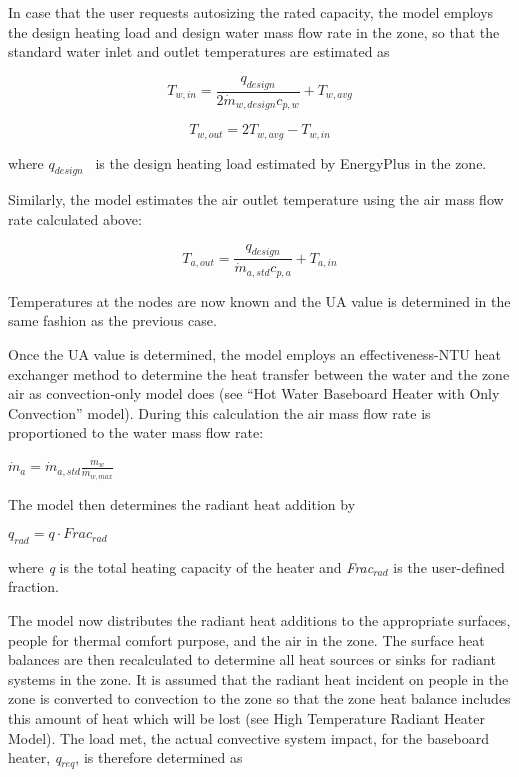 In case that the user requests autosizing the rated capacity, the model employs the design heating load and design water mass flow rate in the zone, so that the standard water inlet and outlet temperatures are estimated as

\begin{equation}
{T_{w,in}} = \frac{{{q_{design}}}}{{2\dot m{}_{w,design}{c_{p,w}}}} + {T_{w,avg}}
\end{equation}

\begin{equation}
{T_{w,out}} = 2{T_{w,avg}} - {T_{w,in}}
\end{equation}

where \({q_{design}}\) ~is the design heating load estimated by EnergyPlus in the zone.

Similarly, the model estimates the air outlet temperature using the air mass flow rate calculated above:

\begin{equation}
{T_{a,out}} = \frac{{{q_{design}}}}{{\dot m_{a,std} {c_{p,a}}}} + {T_{a,in}}
\end{equation}

Temperatures at the nodes are now known and the UA value is determined in the same fashion as the previous case.

Once the UA value is determined, the model employs an effectiveness-NTU heat exchanger method to determine the heat transfer between the water and the zone air as convection-only model does (see ``Hot Water Baseboard Heater with Only Convection'' model). During this calculation the air mass flow rate is proportioned to the water mass flow rate:

$\dot{m}_a = \dot{m}_{a,std} \frac{\dot{m}_w}{\dot{m}_{w,max}}$

The model then determines the radiant heat addition by

$q_{rad} = q \cdot Frac_{rad}$

where \emph{q} is the total heating capacity of the heater and \emph{Frac\(_{rad}\)} is the user-defined fraction.

The model now distributes the radiant heat additions to the appropriate surfaces, people for thermal comfort purpose, and the air in the zone. The surface heat balances are then recalculated to determine all heat sources or sinks for radiant systems in the zone. It is assumed that the radiant heat incident on people in the zone is converted to convection to the zone so that the zone heat balance includes this amount of heat which will be lost (see High Temperature Radiant Heater Model). The load met, the actual convective system impact, for the baseboard heater, \emph{q\(_{req}\)}, is therefore determined as

